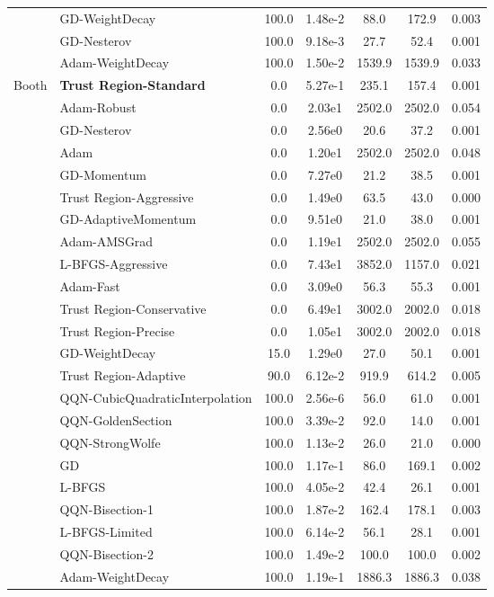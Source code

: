 \documentclass{article}
\begin{document}
\begin{table}[htbp]
{\begin{tabular}{p{2.5cm}p{2.5cm}*{5}{c}}
 & GD-WeightDecay & 100.0 & 1.48e-2 & 88.0 & 172.9 & 0.003 \\
 & GD-Nesterov & 100.0 & 9.18e-3 & 27.7 & 52.4 & 0.001 \\
 & Adam-WeightDecay & 100.0 & 1.50e-2 & 1539.9 & 1539.9 & 0.033 \\
\midrule
\multirow{25}{*}{Booth} & \textbf{Trust Region-Standard} & 0.0 & 5.27e-1 & 235.1 & 157.4 & 0.001 \\
 & Adam-Robust & 0.0 & 2.03e1 & 2502.0 & 2502.0 & 0.054 \\
 & GD-Nesterov & 0.0 & 2.56e0 & 20.6 & 37.2 & 0.001 \\
 & Adam & 0.0 & 1.20e1 & 2502.0 & 2502.0 & 0.048 \\
 & GD-Momentum & 0.0 & 7.27e0 & 21.2 & 38.5 & 0.001 \\
 & Trust Region-Aggressive & 0.0 & 1.49e0 & 63.5 & 43.0 & 0.000 \\
 & GD-AdaptiveMomentum & 0.0 & 9.51e0 & 21.0 & 38.0 & 0.001 \\
 & Adam-AMSGrad & 0.0 & 1.19e1 & 2502.0 & 2502.0 & 0.055 \\
 & L-BFGS-Aggressive & 0.0 & 7.43e1 & 3852.0 & 1157.0 & 0.021 \\
 & Adam-Fast & 0.0 & 3.09e0 & 56.3 & 55.3 & 0.001 \\
 & Trust Region-Conservative & 0.0 & 6.49e1 & 3002.0 & 2002.0 & 0.018 \\
 & Trust Region-Precise & 0.0 & 1.05e1 & 3002.0 & 2002.0 & 0.018 \\
 & GD-WeightDecay & 15.0 & 1.29e0 & 27.0 & 50.1 & 0.001 \\
 & Trust Region-Adaptive & 90.0 & 6.12e-2 & 919.9 & 614.2 & 0.005 \\
 & QQN-CubicQuadraticInterpolation & 100.0 & 2.56e-6 & 56.0 & 61.0 & 0.001 \\
 & QQN-GoldenSection & 100.0 & 3.39e-2 & 92.0 & 14.0 & 0.001 \\
 & QQN-StrongWolfe & 100.0 & 1.13e-2 & 26.0 & 21.0 & 0.000 \\
 & GD & 100.0 & 1.17e-1 & 86.0 & 169.1 & 0.002 \\
 & L-BFGS & 100.0 & 4.05e-2 & 42.4 & 26.1 & 0.001 \\
 & QQN-Bisection-1 & 100.0 & 1.87e-2 & 162.4 & 178.1 & 0.003 \\
 & L-BFGS-Limited & 100.0 & 6.14e-2 & 56.1 & 28.1 & 0.001 \\
 & QQN-Bisection-2 & 100.0 & 1.49e-2 & 100.0 & 100.0 & 0.002 \\
 & Adam-WeightDecay & 100.0 & 1.19e-1 & 1886.3 & 1886.3 & 0.038 \\

\end{tabular}}
\end{table}
\end{document}
